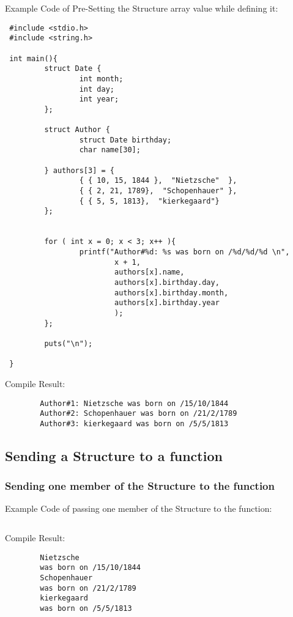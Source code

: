 Example Code of Pre-Setting the Structure array value while defining it:
\begin{lstlisting}
 #include <stdio.h>
 #include <string.h>

 int main(){
         struct Date {
                 int month;
                 int day;
                 int year;
         };

         struct Author {
                 struct Date birthday;
                 char name[30];

         } authors[3] = {
                 { { 10, 15, 1844 },  "Nietzsche"  },
                 { { 2, 21, 1789},  "Schopenhauer" },
                 { { 5, 5, 1813},  "kierkegaard"}
         };


         for ( int x = 0; x < 3; x++ ){
                 printf("Author#%d: %s was born on /%d/%d/%d \n",
                         x + 1,
                         authors[x].name,
                         authors[x].birthday.day,
                         authors[x].birthday.month,
                         authors[x].birthday.year
                         );
         };

         puts("\n");

 }

\end{lstlisting}

Compile Result:
\begin{lstlisting}
        Author#1: Nietzsche was born on /15/10/1844
        Author#2: Schopenhauer was born on /21/2/1789
        Author#3: kierkegaard was born on /5/5/1813
\end{lstlisting}

\subsection{Sending a Structure to a function}
\subsubsection{Sending one member of the Structure to the function}
Example Code of passing one member of the Structure to the function:
\begin{lstlisting}

\end{lstlisting}


Compile Result:
\begin{lstlisting}
        Nietzsche
        was born on /15/10/1844
        Schopenhauer
        was born on /21/2/1789
        kierkegaard
        was born on /5/5/1813
\end{lstlisting}

